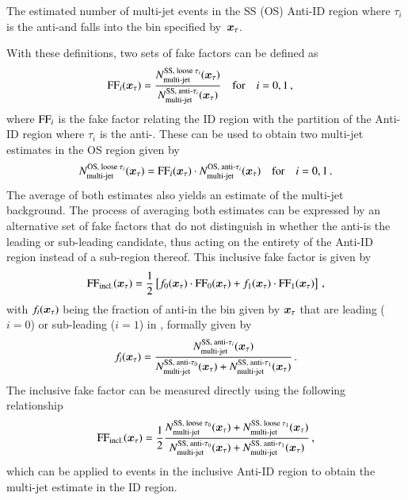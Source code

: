 {\begin{description}[style=standard]
  \item[$\NmjAntiID{SS(OS)}{i}\ffargs$] The estimated number of
    multi-jet events in the SS (OS) Anti-ID region where $\tau_i$ is
    the anti-\tauhadvis and falls into the bin specified
    by~$\bm{x}_\tau$.
  \end{description}
  With these definitions, two sets of fake factors can be defined as
  \begin{align*}
    \text{FF}_{i}( \bm{x}_{\tau} ) &= \frac{N_\text{multi-jet}^{\text{SS, loose }\tau_{i}} ( \bm{x}_{\tau} )}{N_\text{multi-jet}^{\text{SS, anti-}\tau_{i}}( \bm{x}_{\tau} )}
                     \quad \text{for} \quad i = 0, 1 \,\text{,}
  \end{align*}
  where $\text{FF}_{i}$ is the fake factor relating the ID region with the
  partition of the Anti-ID region where $\tau_i$ is the
  anti-\tauhadvis. These can be used to obtain two multi-jet estimates
  in the OS region given by
  \begin{align*}
    N_\text{multi-jet}^{\text{OS, loose }\tau_{i}}( \bm{x}_{\tau} ) = \text{FF}_{i}( \bm{x}_{\tau} ) \cdot N_\text{multi-jet}^{\text{OS, anti-}\tau_{i}}( \bm{x}_{\tau} )
    \quad \text{for} \quad i = 0, 1 \,\text{.}
  \end{align*}
  The average of both estimates also yields an estimate of the
  multi-jet background. The process of averaging both estimates can be
  expressed by an alternative set of fake factors that do not
  distinguish in whether the anti-\tauhadvis is the leading or
  sub-leading \tauhadvis candidate, thus acting on the entirety of the
  Anti-ID region instead of a sub-region thereof. This inclusive fake
  factor is given by
  \begin{align*}
    \text{FF}_\text{incl.}( \bm{x}_{\tau} ) = \frac{1}{2} \left[ f_0( \bm{x}_{\tau} ) \cdot \text{FF}_0( \bm{x}_{\tau} )
    + f_1( \bm{x}_{\tau} ) \cdot \text{FF}_1( \bm{x}_{\tau} ) \right] \,\text{,}
  \end{align*}
  with $f_i( \bm{x}_{\tau} )$ being the fraction of anti-\tauhadvis in the bin
  given by $\bm{x}_\tau$ that are leading ($i = 0$) or sub-leading
  ($i = 1$) in \pT, formally given by
  \begin{align*}
    f_i( \bm{x}_{\tau} ) = \frac{N_\text{multi-jet}^{\text{SS, anti-}\tau_{i}}( \bm{x}_{\tau} )}
                      {N_\text{multi-jet}^{\text{SS, anti-}\tau_{0}}( \bm{x}_{\tau} ) + N_\text{multi-jet}^{\text{SS, anti-}\tau_{1}}( \bm{x}_{\tau} )} \,\text{.}
  \end{align*}
  The inclusive fake factor can be measured directly using the
  following relationship
  \begin{align}
    \text{FF}_\text{incl.}( \bm{x}_{\tau} )
    = \frac{1}{2} \frac{ N_\text{multi-jet}^{\text{SS, loose }\tau_{0}}( \bm{x}_{\tau} ) + N_\text{multi-jet}^{\text{SS, loose }\tau_{1}}( \bm{x}_{\tau} ) }
                       { N_\text{multi-jet}^{\text{SS, anti-}\tau_{0}}( \bm{x}_{\tau} ) + N_\text{multi-jet}^{\text{SS, anti-}\tau_{1}}( \bm{x}_{\tau} ) } \,\text{,}
    \label{eq:inclusive_fake_factor}
  \end{align}
  which can be applied to events in the inclusive Anti-ID region to
  obtain the multi-jet estimate in the ID region.

}
